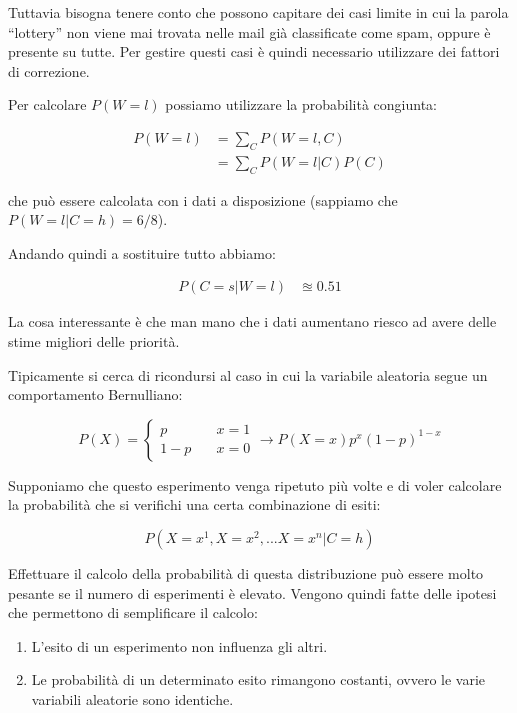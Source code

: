 Tuttavia bisogna tenere conto che possono capitare dei casi limite in cui la parola ``lottery'' non viene mai trovata nelle mail già classificate come spam, oppure è presente su tutte. Per gestire questi casi è quindi necessario utilizzare dei fattori di correzione.

Per calcolare $P(W = l)$ possiamo utilizzare la probabilità congiunta:

\begin{align*}
	P(W = l)&= \sum\limits_{C} P(W = l, C) \\
			&= \sum\limits_{C} P(W = l | C)P(C)
\end{align*}

\noindent che può essere calcolata con i dati a disposizione (sappiamo che $P(W = l | C = h) = 6/8$).

Andando quindi a sostituire tutto abbiamo:

\begin{align*}
	P(C = s | W = l) &\approxeq 0.51
\end{align*}

\noindent La cosa interessante è che man mano che i dati aumentano riesco ad avere delle stime migliori delle priorità.

Tipicamente si cerca di ricondursi al caso in cui la variabile aleatoria segue un comportamento Bernulliano:

$$
P(X) = \begin{cases}
p \quad& x= 1 \\
1-p \quad& x=0
\end{cases} \rightarrow P(X = x) p^x(1-p)^{1-x}
$$

\noindent Supponiamo che questo esperimento venga ripetuto più volte e di voler calcolare la probabilità che si verifichi una certa combinazione di esiti:

$$
P(X = x^1, X=x^2, ... X = x^n | C = h)
$$

\noindent Effettuare il calcolo della probabilità di questa distribuzione può essere molto pesante se il numero di esperimenti è elevato.
Vengono quindi fatte delle ipotesi che permettono di semplificare il calcolo:

\begin{enumerate}
	\item L'esito di un esperimento non influenza gli altri.
	\item Le probabilità di un determinato esito rimangono costanti, ovvero le varie variabili aleatorie sono identiche.
\end{enumerate}

